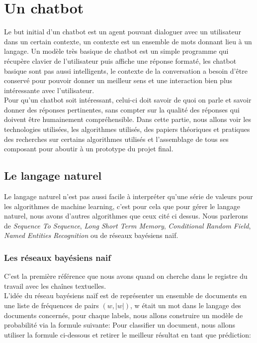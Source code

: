 
\part{Un chatbot}

Le but initial d'un chatbot est un agent pouvant dialoguer avec un utilisateur dans un certain contexte, un contexte est un ensemble de mots donnant lieu à un langage.\linebreak
Un modèle très basique de chatbot est un simple programme qui récupère clavier de l'utilisateur puis affiche une réponse formaté, les chatbot basique sont pas aussi intelligents, le contexte de la conversation a besoin d'être conservé pour pouvoir donner un meilleur sens et une interaction bien plus intéressante avec l'utilisateur.\linebreak
\\
Pour qu'un chatbot soit intéressant, celui-ci doit savoir de quoi on parle et savoir donner des réponses pertinentes, sans compter sur la qualité des réponses qui doivent être humainement compréhensible.\linebreak
\linebreak
Dans cette partie, nous allons voir les technologies utilisées, les algorithmes utilisés, des papiers théoriques et pratiques des recherches sur certains algorithmes utilisés et l'assemblage de tous ses composant pour aboutir à un prototype du projet final.

\chapter{Le langage naturel}

Le langage naturel n'est pas aussi facile à interpréter qu'une série de valeurs pour les algorithmes de machine learning, c'est pour cela que pour gérer le langage naturel, nous avons d'autres algorithmes que ceux cité ci dessus.
Nous parlerons de \textit{Sequence To Sequence}, \textit{Long Short Term Memory},  \textit{Conditional Random Field}, \textit{Named Entities Recognition} ou de réseaux bayésiens naïf.\\

\pagebreak
\section{Les réseaux bayésiens naif}

C'est la première référence que nous avons quand on cherche dans le registre du travail avec les chaînes textuelles.\\
L'idée du réseau bayésiens naïf est de représenter un ensemble de documents en une liste de fréquences de pairs $(w, |w|)$, w était un mot dans le langage des documents concernés, pour chaque labels, nous allons construire un modèle de probabilité via la formule suivante:
Pour classifier un document, nous allons utiliser la formule ci-dessous et retirer le meilleur résultat en tant que prédiction:

